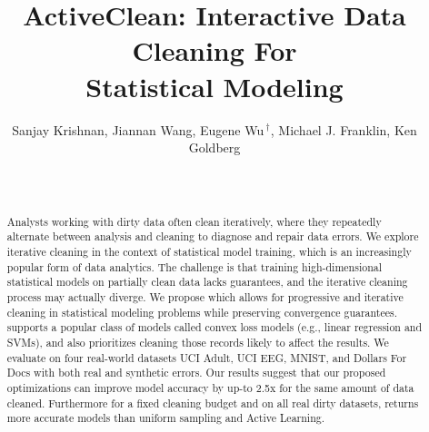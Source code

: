 \documentclass{sig-alternate}
\begin{document}
\newcommand{\reminder}[1]{{{\textcolor{magenta}{\{\{\bf #1\}\}}}\xspace}}
\newcommand{\specialcell}[2][c]{%
  \begin{tabular}[#1]{@{}c@{}}#2\end{tabular}}

\def\ojoin{\setbox0=\hbox{$\bowtie$}%
  \rule[-.02ex]{.25em}{.4pt}\llap{\rule[\ht0]{.25em}{.4pt}}}
\def\leftouterjoin{\mathbin{\ojoin\mkern-5.8mu\bowtie}}
\def\rightouterjoin{\mathbin{\bowtie\mkern-5.8mu\ojoin}}
\def\fullouterjoin{\mathbin{\ojoin\mkern-5.8mu\bowtie\mkern-5.8mu\ojoin}}


\pagestyle{plain}

\title{ActiveClean: Interactive Data Cleaning For \\ Statistical Modeling}

\author{\large Sanjay Krishnan, Jiannan Wang, Eugene Wu{$\,^\dag$}, Michael J. Franklin, Ken Goldberg \\
\vspace{.2em} \\
\vspace{.1em}\\
}



\maketitle

\begin{abstract}
Analysts working with dirty data often clean iteratively, where they repeatedly alternate between analysis and cleaning to diagnose and repair data errors.
We explore iterative cleaning in the context of statistical model training, which is an increasingly popular form of data analytics.  
The challenge is that training high-dimensional statistical models on partially clean data lacks guarantees, and the iterative cleaning process may actually diverge.
We propose \sys which allows for progressive and iterative cleaning in statistical modeling problems while preserving convergence guarantees.
\sys supports a popular class of models called convex loss models (e.g., linear regression and SVMs), and also prioritizes cleaning those records likely to affect the results.
We evaluate \sys on four real-world datasets UCI Adult, UCI EEG, MNIST, and Dollars For Docs with both real and synthetic errors.
Our results suggest that our proposed optimizations can improve model accuracy by up-to 2.5x for the same amount of data cleaned.
Furthermore for a fixed cleaning budget and on all real dirty datasets, \sys returns more accurate models than uniform sampling and Active Learning. 
\end{abstract}
\end{document}
